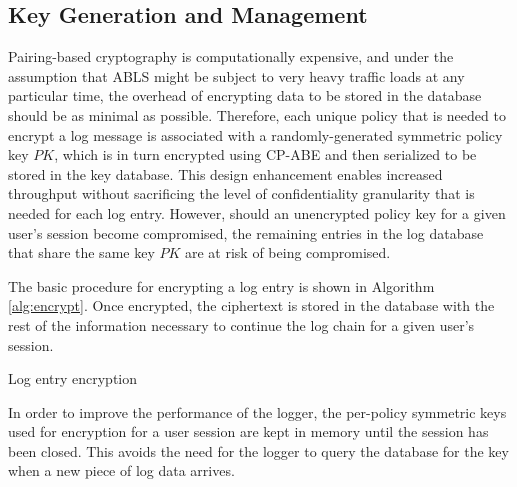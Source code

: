 \documentclass{sig-alternate}
\begin{document}
\subsection{Key Generation and Management}
Pairing-based cryptography is computationally expensive, and under the assumption that ABLS might be subject 
to very heavy traffic loads at any particular time, the 
overhead of encrypting data to be stored in the database should be as minimal as possible. Therefore, each unique
policy that is needed to encrypt a log message is associated with a randomly-generated symmetric policy 
key $PK$, which is in turn encrypted using CP-ABE and then serialized to be stored in the key database. 
This design enhancement enables increased throughput without sacrificing the 
level of confidentiality granularity that is needed for each log entry. However, should an 
unencrypted policy key for a given user's session become compromised, the remaining entries in the 
log database that share the same key $PK$ are at risk of being compromised. 

The basic procedure for encrypting a log entry is shown in Algorithm \ref{alg:encrypt}. Once encrypted, the ciphertext
is stored in the database with the rest of the information necessary to continue the log chain for a given user's session.
  
\begin{algorithm}[h] %
\caption{Log entry encryption} \label{alg:encrypt}
\begin{algorithmic}[1]

\ELSE
\ENDIF
{}
\end{algorithmic}
\end{algorithm}

In order to improve the performance of the logger, the per-policy symmetric keys used for encryption for a 
user session are kept in memory until the session has been closed. This avoids the need for the logger 
to query the database for the key when a new piece of log data arrives. 
\end{document}

